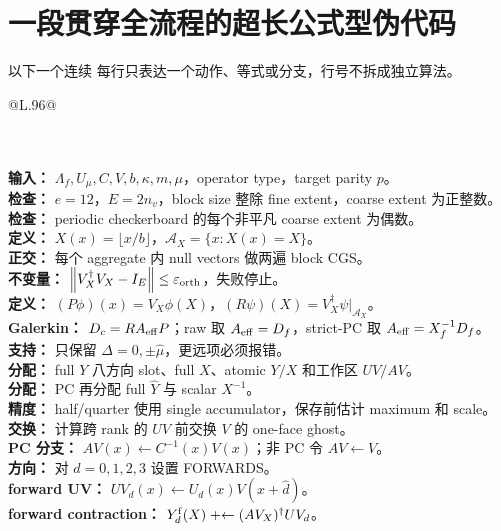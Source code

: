 \documentclass[UTF8,a4paper,11pt]{ctexart}
\newcommand{\code}[1]{\texttt{\detokenize{#1}}}
\newcommand{\Yhat}{\widehat Y}\newcommand{\src}[1]{\par\smallskip\noindent\textit{参考源：}#1\par\smallskip}
\begin{document}
\section{一段贯穿全流程的超长公式型伪代码}
以下一个连续 \code{longtable} 每行只表达一个动作、等式或分支，行号不拆成独立算法。

\begin{longtable}{@{}L{.96\textwidth}@{}}
\caption{从 null vectors 到递归求解的连续算法}\label{tab:longalgo}\\\toprule
\endfirsthead\toprule
{}\\\midrule\endhead\bottomrule\endfoot
\textbf{输入：} $\Lambda_f,U_\mu,C,V,b,\kappa,m,\mu$，operator type，target parity $p$。\\
\textbf{检查：} $e=12$，$E=2n_v$，block size 整除 fine extent，coarse extent 为正整数。\\
\textbf{检查：} periodic checkerboard 的每个非平凡 coarse extent 为偶数。\\
\textbf{定义：} $X(x)=\lfloor x/b\rfloor$，$\mathcal A_X=\{x:X(x)=X\}$。\\
\textbf{正交：} 每个 aggregate 内 null vectors 做两遍 block CGS。\\
\textbf{不变量：} $\left\lVert V_X^\dagger V_X-I_E\right\rVert\le\varepsilon_{\rm orth}$，失败停止。\\
\textbf{定义：} $(P\phi)(x)=V_X\phi(X)$，$(R\psi)(X)=V_X^\dagger\psi|_{\mathcal A_X}$。\\
\textbf{Galerkin：} $D_c=R A_{\rm eff}P$；raw 取 $A_{\rm eff}=D_f$，strict-PC 取 $A_{\rm eff}=X_f^{-1}D_f$。\\
\textbf{支持：} 只保留 $\Delta=0,\pm\hat\mu$，更远项必须报错。\\
\textbf{分配：} full $Y$ 八方向 slot、full $X$、atomic $Y/X$ 和工作区 $UV/AV$。\\
\textbf{分配：} PC 再分配 full $\Yhat$ 与 scalar $X^{-1}$。\\
\textbf{精度：} half/quarter 使用 single accumulator，保存前估计 maximum 和 scale。\\
\textbf{交换：} 计算跨 rank 的 $UV$ 前交换 $V$ 的 one-face ghost。\\
\textbf{PC 分支：} $AV(x)\leftarrow C^{-1}(x)V(x)$；非 PC 令 $AV\leftarrow V$。\\
\textbf{方向：} 对 $d=0,1,2,3$ 设置 FORWARDS。\\
\textbf{forward UV：} $UV_d(x)\leftarrow U_d(x)V(x+\hat d)$。\\
\textbf{forward contraction：} $Y_d^{\rm f}(X)\mathrel{+}\leftarrow(AV_X)^\dagger UV_d$。\\

\end{longtable}
\end{document}
